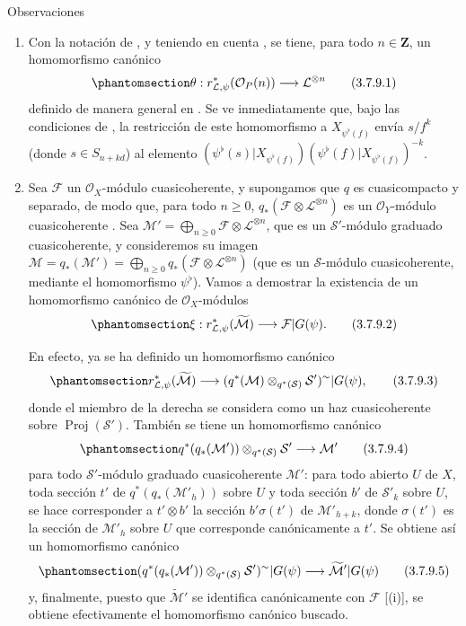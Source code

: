 \documentclass[oneside,10pt]{amsart}
\renewcommand{\geq}{\geqslant}
\let\EGAOriginalLabel\label
\renewcommand{\label}[1]{\phantomsection\EGAOriginalLabel{#1}}
\begin{document}
\begin{namedtheorem}[3.7.9]{Observaciones}
\label{II.3.7.9-fr}
\medskip\noindent
\begin{enumerate}
  \item[(i)] Con la notación de , y teniendo en cuenta , se tiene, para todo $n\in\mathbf{Z}$, un homomorfismo canónico
    \[
    \label{II.3.7.9.1-fr}
      \theta:r_{\mathcal{L},\psi}^*(\mathcal{O}_P(n))\longrightarrow
      \mathcal{L}^{\otimes n}
    \tag{3.7.9.1}
    \]
    definido de manera general en .
    Se ve inmediatamente que, bajo las condiciones de , la restricción de este homomorfismo a $X_{\psi^\flat(f)}$ envía $s/f^k$ (donde $s\in S_{n+kd}$) al elemento $(\psi^\flat(s)|X_{\psi^\flat(f)})
    (\psi^\flat(f)|X_{\psi^\flat(f)})^{-k}$.
  \item[(ii)] Sea $\mathcal{F}$ un $\mathcal{O}_X$-módulo cuasicoherente, y supongamos que $q$ es cuasicompacto y separado, de modo que, para todo $n\geq0$, $q_*(\mathcal{F}\otimes\mathcal{L}^{\otimes n})$ es un $\mathcal{O}_Y$-módulo cuasicoherente .
    Sea $\mathcal{M}'=\bigoplus_{n\geq0}\mathcal{F}\otimes
    \mathcal{L}^{\otimes n}$, que es un $\mathcal{S}'$-módulo graduado cuasicoherente, y consideremos su imagen $\mathcal{M}=q_*(\mathcal{M}')=
    \bigoplus_{n\geq0}q_*(\mathcal{F}\otimes\mathcal{L}^{\otimes n})$ (que es un $\mathcal{S}$-módulo cuasicoherente, mediante el homomorfismo $\psi^\flat$).
    Vamos a demostrar la existencia de un homomorfismo canónico de $\mathcal{O}_X$-módulos
    \[
    \label{II.3.7.9.2-fr}
      \xi:r_{\mathcal{L},\psi}^*(\widetilde{\mathcal{M}})
      \longrightarrow\mathcal{F}|G(\psi).
    \tag{3.7.9.2}
    \]

    En efecto, ya se ha definido  un homomorfismo canónico
    \[
    \label{II.3.7.9.3-fr}
      r_{\mathcal{L},\psi}^*(\widetilde{\mathcal{M}})
      \longrightarrow
      (q^*(\mathcal{M})\otimes_{q^*(\mathcal{S})}\mathcal{S}')^{\sim}
      |G(\psi),
    \tag{3.7.9.3}
    \]
    donde el miembro de la derecha se considera como un haz cuasicoherente sobre $\operatorname{Proj}(\mathcal{S}')$.
    También se tiene un homomorfismo canónico
    \[
    \label{II.3.7.9.4-fr}
      q^*(q_*(\mathcal{M}'))\otimes_{q^*(\mathcal{S})}\mathcal{S}'
      \longrightarrow\mathcal{M}'
    \tag{3.7.9.4}
    \]
    para todo $\mathcal{S}'$-módulo graduado cuasicoherente $\mathcal{M}'$: para todo abierto $U$ de $X$, toda sección $t'$ de $q^*(q_*(\mathcal{M}'_h))$ sobre $U$ y toda sección $b'$ de $\mathcal{S}'_k$ sobre $U$, se hace corresponder a $t'\otimes b'$ la sección $b'\sigma(t')$ de $\mathcal{M}'_{h+k}$, donde $\sigma(t')$ es la sección de $\mathcal{M}'_h$ sobre $U$ que corresponde canónicamente  a $t'$.
    Se obtiene así un homomorfismo canónico
    \[
    \label{II.3.7.9.5-fr}
      (q^*(q_*(\mathcal{M}'))\otimes_{q^*(\mathcal{S})}\mathcal{S}')^{\sim}
      |G(\psi)\longrightarrow\widetilde{\mathcal{M}}'|G(\psi)
    \tag{3.7.9.5}
    \]
    y, finalmente, puesto que $\widetilde{\mathcal{M}}'$ se identifica canónicamente con $\mathcal{F}$ [(i)], se obtiene efectivamente el homomorfismo canónico buscado.


\end{enumerate}
\end{namedtheorem}
\end{document}
